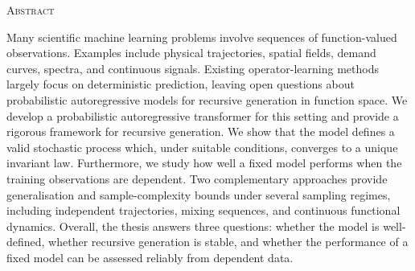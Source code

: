 \thispagestyle{empty}

\vspace*{\fill}

\begin{center}
    {\scshape Abstract}

\begin{minipage}{0.9\textwidth}

Many scientific machine learning problems involve sequences of function-valued observations. Examples include physical trajectories, spatial fields, demand curves, spectra, and continuous signals.
Existing operator-learning methods largely focus on deterministic prediction, leaving open questions about probabilistic autoregressive models for recursive generation in function space.
We develop a probabilistic autoregressive transformer for this setting and provide a rigorous framework for recursive generation. We show that the model defines a valid stochastic process which, under suitable conditions, converges to a unique invariant law. Furthermore, we study how well a fixed model performs when the training observations are dependent. Two complementary approaches provide generalisation and sample-complexity bounds under several sampling regimes, including independent trajectories, mixing sequences, and continuous functional dynamics. Overall, the thesis answers three questions: whether the model is well-defined, whether recursive generation is stable, and whether the performance of a fixed model can be assessed reliably from dependent data.
 \end{minipage}
\end{center}



\vspace*{\fill}
